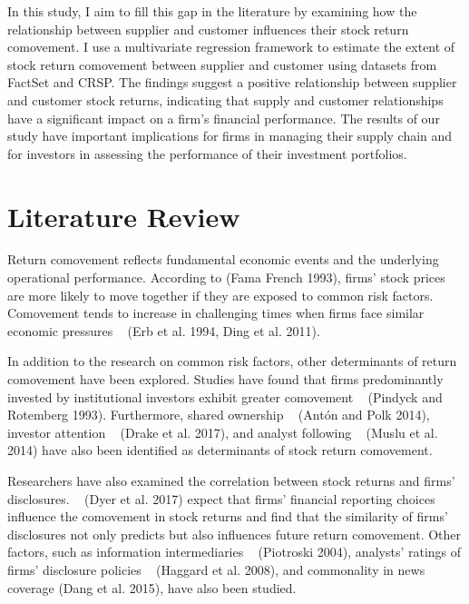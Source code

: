 \documentclass[12pt,english]{article}
\begin{document}
In this study, I aim to fill this gap in the literature by examining how the relationship between supplier and customer influences their stock return comovement. I use a multivariate regression framework to estimate the extent of stock return comovement between supplier and customer using datasets from FactSet and CRSP. The findings suggest a positive relationship between supplier and customer stock returns, indicating that supply and customer relationships have a significant impact on a firm's financial performance. The results of our study have important implications for firms in managing their supply chain and for investors in assessing the performance of their investment portfolios.


\section{Literature Review}\label{sec:litreview}


Return comovement reflects fundamental economic events and the underlying operational performance. According to \cite{fama1993common} (Fama French 1993), firms' stock prices are more likely to move together if they are exposed to common risk factors. Comovement tends to increase in challenging times when firms face similar economic pressures ~\citep {erb1994forecasting} (Erb et al. 1994, Ding et al. 2011).

In addition to the research on common risk factors, other determinants of return comovement have been explored. Studies have found that firms predominantly invested by institutional investors exhibit greater comovement ~\citep{pindyck1993comovement} (Pindyck and Rotemberg 1993). Furthermore, shared ownership ~\citep{anton2014connected} (Antón and Polk 2014), investor attention ~\citep{drake2017comovement} (Drake et al. 2017), and analyst following ~\citep{muslu2014sell} (Muslu et al. 2014) have also been identified as determinants of stock return comovement.

Researchers have also examined the correlation between stock returns and firms' disclosures. ~\citet{dyer2017evolution} (Dyer et al. 2017) expect that firms' financial reporting choices influence the comovement in stock returns and find that the similarity of firms' disclosures not only predicts but also influences future return comovement. Other factors, such as information intermediaries ~\citep{piotroski2004influence} (Piotroski 2004), analysts' ratings of firms' disclosure policies ~\citep{haggard2008does} (Haggard et al. 2008), and commonality in news coverage \citep{dang2015commonality} (Dang et al. 2015), have also been studied.
\end{document}
